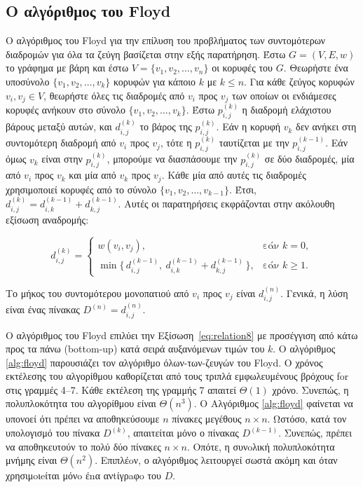 \documentclass[12pt,a4paper]{article} %
\begin{document}
{\subsection{Ο αλγόριθμος του Floyd}
Ο αλγόριθμος του Floyd για την επίλυση του προβλήματος των συντομότερων διαδρομών για όλα τα ζεύγη βασίζεται στην εξής παρατήρηση. Έστω $G=(V,E,w)$ το γράφημα με βάρη και έστω $V=\{v_1,v_2,\dots,v_n\}$ οι κορυφές του $G$. Θεωρήστε ένα υποσύνολο $\{v_1,v_2,\dots,v_k\}$ κορυφών για κάποιο $k$ με $k\le n$. Για κάθε ζεύγος κορυφών $v_i,v_j\in V$, θεωρήστε όλες τις διαδρομές από $v_i$ προς $v_j$ των οποίων οι ενδιάμεσες κορυφές ανήκουν στο σύνολο $\{v_1,v_2,\dots,v_k\}$. Έστω $p_{i,j}^{(k)}$ η διαδρομή ελάχιστου βάρους μεταξύ αυτών, και $d_{i,j}^{(k)}$ το βάρος της $p_{i,j}^{(k)}$. Εάν η κορυφή $v_k$ δεν ανήκει στη συντομότερη διαδρομή από $v_i$ προς $v_j$, τότε η $p_{i,j}^{(k)}$ ταυτίζεται με την $p_{i,j}^{(k-1)}$. Εάν όμως $v_k$ είναι στην $p_{i,j}^{(k)}$, μπορούμε να διασπάσουμε την $p_{i,j}^{(k)}$ σε δύο διαδρομές, μία από $v_i$ προς $v_k$ και μία από $v_k$ προς $v_j$. Κάθε μία από αυτές τις διαδρομές χρησιμοποιεί κορυφές από το σύνολο $\{v_1,v_2,\dots,v_{k-1}\}$. Έτσι, $d_{i,j}^{(k)} = d_{i,k}^{(k-1)} + d_{k,j}^{(k-1)}$. Αυτές οι παρατηρήσεις εκφράζονται στην ακόλουθη εξίσωση αναδρομής:

\begin{equation}
d_{i,j}^{(k)} = \begin{cases}
w(v_i,v_j), & \text{εάν } k = 0, \\
\min\{\,d_{i,j}^{(k-1)},\ d_{i,k}^{(k-1)} + d_{k,j}^{(k-1)}\,\}, & \text{εάν } k \ge 1.
\end{cases}
\label{eq:relation8}
\end{equation}

Το μήκος του συντομότερου μονοπατιού από $v_i$ προς $v_j$ είναι $d_{i,j}^{(n)}$. Γενικά, η λύση είναι ένας πίνακας $D^{(n)} = d_{i,j}^{(n)}$.

Ο αλγόριθμος του Floyd επιλύει την Εξίσωση~\ref{eq:relation8} με προσέγγιση από κάτω προς τα πάνω (bottom-up) κατά σειρά αυξανόμενων τιμών του $k$. Ο αλγόριθμος \ref{alg:floyd} παρουσιάζει τον αλγόριθμο όλων-των-ζευγών του Floyd. Ο χρόνος εκτέλεσης του αλγορίθμου καθορίζεται από τους τριπλά εμφωλευμένους βρόχους for στις γραμμές 4–7. Κάθε εκτέλεση της γραμμής 7 απαιτεί $\Theta(1)$ χρόνο. Συνεπώς, η πολυπλοκότητα του αλγορίθμου είναι $\Theta(n^3)$. Ο Αλγόριθμος \ref{alg:floyd} φαίνεται να υπονοεί ότι πρέπει να αποθηκεύσουμε $n$ πίνακες μεγέθους $n\times n$. Ωστόσο, κατά τον υπολογισμό του πίνακα $D^{(k)}$, απαιτείται μόνο ο πίνακας $D^{(k-1)}$. Συνεπώς, πρέπει να αποθηκευτούν το πολύ δύο πίνακες $n\times n$. Οπότε, η συνoλική πολυπλοκότητα μνήμης είναι $\Theta(n^2)$. Επιπλέoν, ο αλγόριθμος λειτουργεί σωστά ακόμη και όταν χρησιμoιeίται μόνo έnα ανtίγρaφo του $D$.

}
\end{document}
